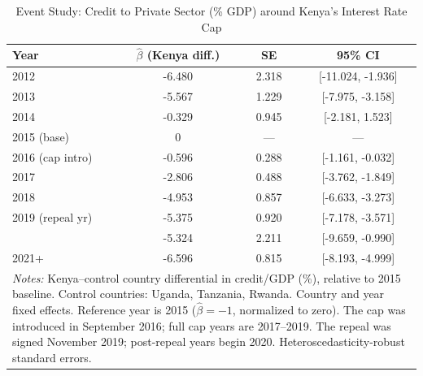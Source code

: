 \begin{table}[htbp]
\centering
\caption{Event Study: Credit to Private Sector (\% GDP) around Kenya's Interest Rate Cap}
\label{tab:eventstudy}
\begin{tabular}{lccc}
\hline\hline
  Year & $\hat{\beta}$ (Kenya diff.) & SE & 95\% CI \\
\hline
  2012 & -6.480 & 2.318 & [-11.024, -1.936] \\
  2013 & -5.567 & 1.229 & [-7.975, -3.158] \\
  2014 & -0.329 & 0.945 & [-2.181, 1.523] \\
  2015 (base) & 0 & --- & --- \\[2pt]
\hline
  2016 (cap intro) & -0.596 & 0.288 & [-1.161, -0.032] \\
  2017 & -2.806 & 0.488 & [-3.762, -1.849] \\
  2018 & -4.953 & 0.857 & [-6.633, -3.273] \\
  2019 (repeal yr) & -5.375 & 0.920 & [-7.178, -3.571] \\
\hdashline
  2020 & -5.324 & 2.211 & [-9.659, -0.990] \\
  2021+ & -6.596 & 0.815 & [-8.193, -4.999] \\
\hline\hline
\multicolumn{4}{p{0.7\textwidth}}{\footnotesize \textit{Notes:} Kenya--control country differential in credit/GDP (\%), relative to 2015 baseline. Control countries: Uganda, Tanzania, Rwanda. Country and year fixed effects. Reference year is 2015 ($\hat{\beta}=-1$, normalized to zero). The cap was introduced in September 2016; full cap years are 2017--2019. The repeal was signed November 2019; post-repeal years begin 2020. Heteroscedasticity-robust standard errors.}
\end{tabular}
\end{table}
